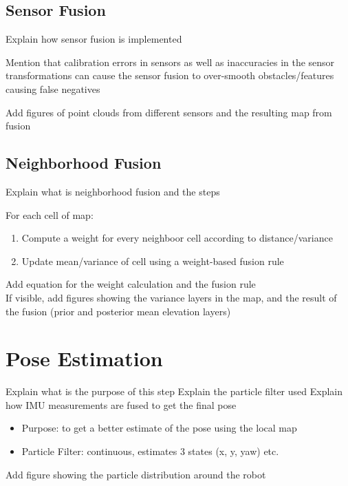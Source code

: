 \subsection{Sensor Fusion}

Explain how sensor fusion is implemented

\noindent
Mention that calibration errors in sensors as well as inaccuracies in the sensor transformations can cause the sensor fusion to over-smooth obstacles/features causing false negatives

\noindent
Add figures of point clouds from different sensors and the resulting map from fusion

\subsection{Neighborhood Fusion}

Explain what is neighborhood fusion and the steps

\bigskip
\noindent
For each cell of map:
\begin{enumerate}
    \item Compute a weight for every neighboor cell according to distance/variance
    \item Update mean/variance of cell using a weight-based fusion rule
\end{enumerate}

\noindent
Add equation for the weight calculation and the fusion rule\\
If visible, add figures showing the variance layers in the map, and the result of the fusion (prior and posterior mean elevation layers)

\section{Pose Estimation}

Explain what is the purpose of this step
Explain the particle filter used
Explain how IMU measurements are fused to get the final pose

\begin{itemize}
    \item Purpose: to get a better estimate of the pose using the local map
    \item Particle Filter: continuous, estimates 3 states (x, y, yaw) etc.
\end{itemize}

\noindent
Add figure showing the particle distribution around the robot

